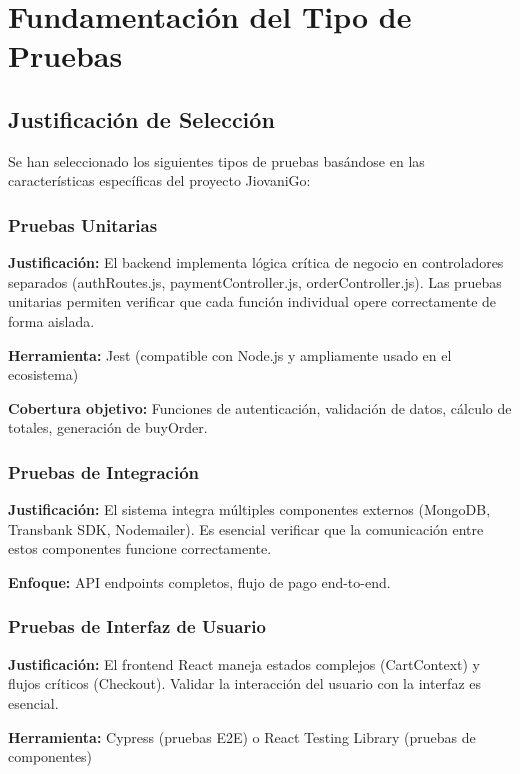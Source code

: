 \documentclass[12pt,a4paper]{article}
\begin{document}
\section{Fundamentación del Tipo de Pruebas}

\subsection{Justificación de Selección}

Se han seleccionado los siguientes tipos de pruebas basándose en las características específicas del proyecto JiovaniGo:

\subsubsection{Pruebas Unitarias}
\textbf{Justificación:} El backend implementa lógica crítica de negocio en controladores separados (authRoutes.js, paymentController.js, orderController.js). Las pruebas unitarias permiten verificar que cada función individual opere correctamente de forma aislada.

\textbf{Herramienta:} Jest (compatible con Node.js y ampliamente usado en el ecosistema)

\textbf{Cobertura objetivo:} Funciones de autenticación, validación de datos, cálculo de totales, generación de buyOrder.

\subsubsection{Pruebas de Integración}
\textbf{Justificación:} El sistema integra múltiples componentes externos (MongoDB, Transbank SDK, Nodemailer). Es esencial verificar que la comunicación entre estos componentes funcione correctamente.

\textbf{Enfoque:} API endpoints completos, flujo de pago end-to-end.

\subsubsection{Pruebas de Interfaz de Usuario}
\textbf{Justificación:} El frontend React maneja estados complejos (CartContext) y flujos críticos (Checkout). Validar la interacción del usuario con la interfaz es esencial.

\textbf{Herramienta:} Cypress (pruebas E2E) o React Testing Library (pruebas de componentes)
\end{document}
